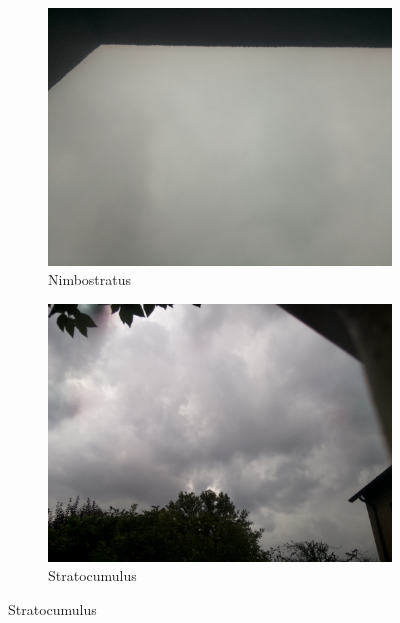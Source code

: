 \begin{figure}[h]
\begin{subfigure}[b]{0.31\textwidth}
		\end{subfigure}
		\begin{subfigure}[b]{0.31\textwidth}
		\begin{center}
				\includegraphics[width=\textwidth]{./pictures/cloudtypes/nimbostratus.pdf}
		\end{center}
		\caption{Nimbostratus}
		\label{fig:nimbostratus}
		\end{subfigure}
		\begin{subfigure}[b]{0.31\textwidth}
		\begin{center}
				\includegraphics[width=\textwidth]{./pictures/cloudtypes/stratocumulus.pdf}
		\end{center}
		\caption{Stratocumulus}
		\label{fig:stratocumulus}

\end{subfigure}
\end{figure}
